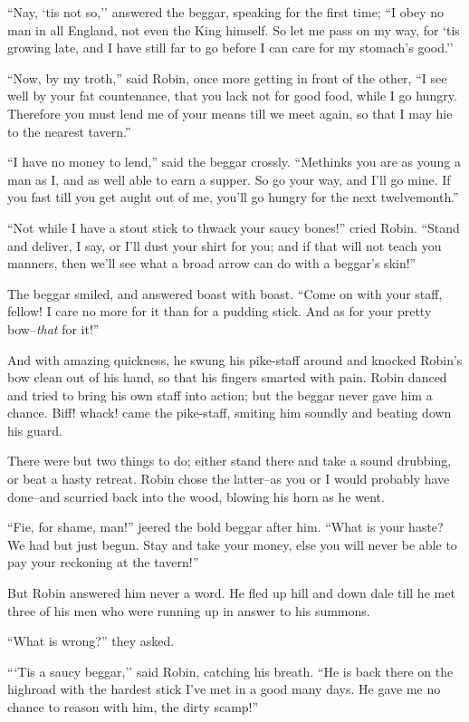 ``Nay, `tis not so,'' answered the beggar, speaking for the first time;
``I obey no man in all England, not even the King himself. So let me
pass on my way, for `tis growing late, and I have still far to go before
I can care for my stomach's good.''

``Now, by my troth,'' said Robin, once more getting in front of the
other, ``I see well by your fat countenance, that you lack not for good
food, while I go hungry. Therefore you must lend me of your means till
we meet again, so that I may hie to the nearest tavern.''

``I have no money to lend,'' said the beggar crossly. ``Methinks you are
as young a man as I, and as well able to earn a supper. So go your way,
and I'll go mine. If you fast till you get aught out of me, you'll go
hungry for the next twelvemonth.''

``Not while I have a stout stick to thwack your saucy bones!'' cried
Robin. ``Stand and deliver, I say, or I'll dust your shirt for you; and
if that will not teach you manners, then we'll see what a broad arrow
can do with a beggar's skin!''

The beggar smiled, and answered boast with boast. ``Come on with your
staff, fellow! I care no more for it than for a pudding stick. And as
for your pretty bow--\emph{that} for it!''

And with amazing quickness, he swung his pike-staff around and knocked
Robin's bow clean out of his hand, so that his fingers smarted with
pain. Robin danced and tried to bring his own staff into action; but the
beggar never gave him a chance. Biff! whack! came the pike-staff,
smiting him soundly and beating down his guard.

There were but two things to do; either stand there and take a sound
drubbing, or beat a hasty retreat. Robin chose the latter--as you or I
would probably have done--and scurried back into the wood, blowing his
horn as he went.

``Fie, for shame, man!'' jeered the bold beggar after him. ``What is
your haste? We had but just begun. Stay and take your money, else you
will never be able to pay your reckoning at the tavern!''

But Robin answered him never a word. He fled up hill and down dale till
he met three of his men who were running up in answer to his summons.

``What is wrong?'' they asked.

```Tis a saucy beggar,'' said Robin, catching his breath. ``He is back
there on the highroad with the hardest stick I've met in a good many
days. He gave me no chance to reason with him, the dirty scamp!''


